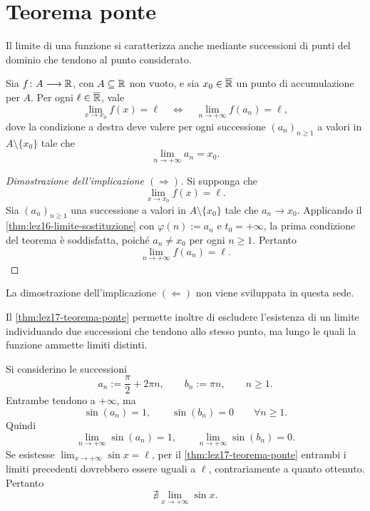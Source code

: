 \clearpage

\section{Teorema ponte}
\label{sec:lez17-teorema-ponte}

Il limite di una funzione si caratterizza anche mediante
successioni di punti del dominio che tendono al punto
considerato.

\begin{theorem}
\label{thm:lez17-teorema-ponte}
Sia \(f\colon A\longrightarrow\mathbb{R}\), con
\(A\subseteq\mathbb{R}\) non vuoto, e sia
\(x_0\in\overline{\mathbb{R}}\) un punto di accumulazione per \(A\).
Per ogni \(\ell\in\overline{\mathbb{R}}\), vale
\[
  \lim_{x\to x_0}f(x)=\ell
  \quad\Longleftrightarrow\quad
  \lim_{n\to+\infty}f(a_n)=\ell,
\]
dove la condizione a destra deve valere per ogni successione
\((a_n)_{n\ge1}\) a valori in \(A\setminus\{x_0\}\)
tale che
\[
  \lim_{n\to+\infty}a_n=x_0.
\]
\end{theorem}

\begin{proof}[Dimostrazione dell'implicazione \((\Rightarrow)\)]
Si supponga che
\[
  \lim_{x\to x_0}f(x)=\ell.
\]
Sia \((a_n)_{n\ge1}\) una successione a valori in
\(A\setminus\{x_0\}\) tale che \(a_n\to x_0\).
Applicando il \cref{thm:lez16-limite-sostituzione}
con \(\varphi(n):=a_n\) e \(t_0=+\infty\),
la prima condizione del teorema è soddisfatta,
poiché \(a_n\ne x_0\) per ogni \(n\ge1\).
Pertanto
\[
  \lim_{n\to+\infty}f(a_n)=\ell.
\]
\end{proof}

La dimostrazione dell'implicazione \((\Leftarrow)\)
non viene sviluppata in questa sede.

Il \cref{thm:lez17-teorema-ponte} permette inoltre di
escludere l'esistenza di un limite individuando due successioni
che tendono allo stesso punto, ma lungo le quali la funzione
ammette limiti distinti.

\begin{example}
\label{ex:lez17-seno-infinito}
Si considerino le successioni
\[
  a_n:=\frac\pi2+2\pi n,
  \qquad b_n:=\pi n,
  \qquad n\ge1.
\]
Entrambe tendono a \(+\infty\), ma
\[
  \sin(a_n)=1,
  \qquad \sin(b_n)=0
  \qquad\forall n\ge1.
\]
Quindi
\[
  \lim_{n\to+\infty}\sin(a_n)=1,
  \qquad
  \lim_{n\to+\infty}\sin(b_n)=0.
\]
Se esistesse \(\lim_{x\to+\infty}\sin x=\ell\),
per il \cref{thm:lez17-teorema-ponte} entrambi i
limiti precedenti dovrebbero essere uguali a \(\ell\),
contrariamente a quanto ottenuto. Pertanto
\[
  \nexists\lim_{x\to+\infty}\sin x.
\]
\end{example}

